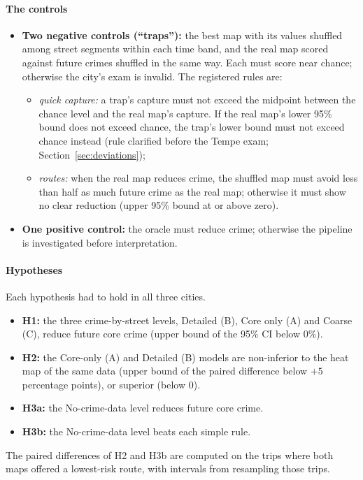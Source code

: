 \documentclass[preprint,12pt,authoryear]{elsarticle}
\begin{document}
\paragraph{The controls}
\begin{itemize}
  \item \textbf{Two negative controls (``traps''):} the best map with its values shuffled among street segments within each time band, and the real map scored against future crimes shuffled in the same way. Each must score near chance; otherwise the city's exam is invalid. The registered rules are:
  \begin{itemize}
    \item \emph{quick capture:} a trap's capture must not exceed the midpoint between the chance level and the real map's capture. If the real map's lower 95\% bound does not exceed chance, the trap's lower bound must not exceed chance instead (rule clarified before the Tempe exam; Section~\ref{sec:deviations});
    \item \emph{routes:} when the real map reduces crime, the shuffled map must avoid less than half as much future crime as the real map; otherwise it must show no clear reduction (upper 95\% bound at or above zero).
  \end{itemize}
  \item \textbf{One positive control:} the oracle must reduce crime; otherwise the pipeline is investigated before interpretation.
\end{itemize}

\paragraph{Hypotheses} Each hypothesis had to hold in all three cities.
\begin{itemize}
  \item \textbf{H1:} the three crime-by-street levels, Detailed (B), Core only (A) and Coarse (C), reduce future core crime (upper bound of the 95\% CI below 0\%).
  \item \textbf{H2:} the Core-only (A) and Detailed (B) models are non-inferior to the heat map of the same data (upper bound of the paired difference below $+5$ percentage points), or superior (below 0).
  \item \textbf{H3a:} the No-crime-data level reduces future core crime.
  \item \textbf{H3b:} the No-crime-data level beats each simple rule.
\end{itemize}
The paired differences of H2 and H3b are computed on the trips where both maps offered a lowest-risk route, with intervals from resampling those trips.
\end{document}
